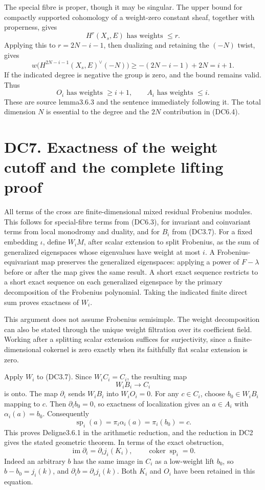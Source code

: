 \documentclass[
]{report}
\begin{document}
The special fibre is proper, though it may be singular. The upper bound
for compactly supported cohomology of a weight-zero constant sheaf,
together with properness, gives \[
H^r(X_s,E)\text{ has weights }\le r.
\tag{DC6.3}
\] Applying this to \(r=2N-i-1\), then dualizing and retaining the
\((-N)\) twist, gives \[
w\bigl(H^{2N-i-1}(X_s,E)^\vee(-N)\bigr)
 \ge -(2N-i-1)+2N=i+1.
\tag{DC6.4}
\] If the indicated degree is negative the group is zero, and the bound
remains valid. Thus \[
O_i\text{ has weights }\ge i+1,
\qquad A_i\text{ has weights }\le i.
\tag{DC6.5}
\] These are source lemma3.6.3 and the sentence immediately following
it. The total dimension \(N\) is essential to the degree and the \(2N\)
contribution in (DC6.4).

\section{DC7. Exactness of the weight cutoff and the complete lifting
proof}\label{dc7.-exactness-of-the-weight-cutoff-and-the-complete-lifting-proof}

All terms of the cross are finite-dimensional mixed residual Frobenius
modules. This follows for special-fibre terms from (DC6.3), for
invariant and coinvariant terms from local monodromy and duality, and
for \(B_i\) from (DC3.7). For a fixed embedding \(\iota\), define
\(W_iM\), after scalar extension to split Frobenius, as the sum of
generalized eigenspaces whose eigenvalues have weight at most \(i\). A
Frobenius-equivariant map preserves the generalized eigenspaces:
applying a power of \(F-\lambda\) before or after the map gives the same
result. A short exact sequence restricts to a short exact sequence on
each generalized eigenspace by the primary decomposition of the
Frobenius polynomial. Taking the indicated finite direct sum proves
exactness of \(W_i\).

This argument does not assume Frobenius semisimple. The weight
decomposition can also be stated through the unique weight filtration
over its coefficient field. Working after a splitting scalar extension
suffices for surjectivity, since a finite-dimensional cokernel is zero
exactly when its faithfully flat scalar extension is zero.

Apply \(W_i\) to (DC3.7). Since \(W_iC_i=C_i\), the resulting map \[
W_iB_i\longrightarrow C_i
\tag{DC7.1}
\] is onto. The map \(\partial_i\) sends \(W_iB_i\) into \(W_iO_i=0\).
For any \(c\in C_i\), choose \(b_0\in W_iB_i\) mapping to \(c\). Then
\(\partial_i b_0=0\), so exactness of localization gives an \(a\in A_i\)
with \(\alpha_i(a)=b_0\). Consequently \[
\operatorname{sp}_i(a)=\pi_i\alpha_i(a)=\pi_i(b_0)=c.
\tag{DC7.2}
\] This proves Deligne3.6.1 in the arithmetic reduction, and the
reduction in DC2 gives the stated geometric theorem. In terms of the
exact obstruction, \[
\operatorname{im}\partial_i=\partial_i j_i(K_i),
\qquad
\operatorname{coker}\operatorname{sp}_i=0.
\tag{DC7.3}
\] Indeed an arbitrary \(b\) has the same image in \(C_i\) as a
low-weight lift \(b_0\), so \(b-b_0=j_i(k)\), and
\(\partial_i b=\partial_i j_i(k)\). Both \(K_i\) and \(O_i\) have been
retained in this equation.
\end{document}
